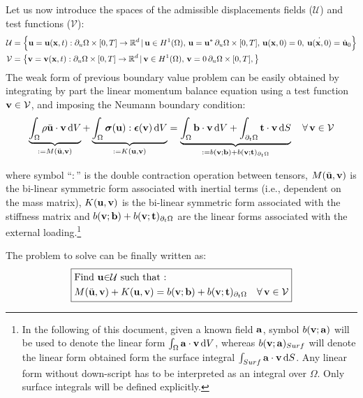 Let us now introduce the spaces of the admissible displacements fields ($\mathcal{U}$) and test functions ($\mathcal{V}$):
%
\begin{equation}
\begin{aligned}\mathcal{U} & =\left\{ {\bf{u}}={\bf{u}}({\bf{x}},t):\partial_{u}\Omega\times[0,T]\to\mathbb{R}^{d}\,|\,{\bf{u}}\in H^{1}(\Omega),\,{\bf{u}}={\bf{u}}^{*}\,\partial_{u}\Omega\times[0,T],\,{\bf{u}}({\bf{x}},0)=0,\:\dot{{\bf{u}}({\bf{x}},0)}=\dot{{\bf{u}}}_{0}\right\} \\
\mathcal{V} & =\left\{ {\bf{v}}={\bf{v}}({\bf{x}},t):\partial_{u}\Omega\times[0,T]\to\mathbb{R}^{d}\,|\,{\bf{v}}\in H^{1}(\Omega),\,{\bf{v}}=0\,\partial_{u}\Omega\times[0,T],\right\} 
\end{aligned}
\end{equation}
%
The weak form of previous boundary value problem can be easily obtained
by integrating by part the linear momentum balance equation using
a test function ${\bf{v}}\in\mathcal{V}$, and imposing the Neumann boundary
condition:
%
\begin{equation}
%
\underbrace{\int_{\Omega}\rho\ddot{\bu}\cdot\bv\,{\rm d}V}_{:=M(\ddot{\bu},\bv)}+\underbrace{\int_{\Omega}\bsigma(\bu):\bepsilon(\bv)\,{\rm d}V}_{:=K(\bu,\bv)}=\underbrace{\int_{\Omega}\bb\cdot\bv\,{\rm d}V+\int_{\partial_{t}\Omega}\bt\cdot\bv\,{\rm d}S}_{:=b(\bv;\bb)+b(\bv;\bt)_{\partial_{t}\Omega}}\quad\forall\,\bv\in\mathcal{V}
%
\end{equation}

where symbol ``$:$'' is the double contraction operation between
tensors, $M(\ddot{{\bf{u}}},{\bf{v}})$ is the bi-linear symmetric form associated
with inertial terms (i.e., dependent on the mass matrix), $K({\bf{u}},{\bf{v}})$
is the bi-linear symmetric form associated with the stiffness matrix
and $b({\bf{v}};{\bf{b}})+b({\bf{v}};{\bf t})_{\partial_{t}\Omega}$ are the linear forms
associated with the external loading.\footnote{In the following of this document, given a known field ${\bf{a}}$, symbol
$b({\bf{v}};{\bf{a}})$ will be used to denote the linear form $\int_{\Omega}{\bf{a}}\cdot{\bf{v}}\,{\rm d}V$,
whereas $b({\bf{v}};{\bf{a}})_{Surf}$ will denote the linear form obtained
form the surface integral $\int_{Surf}{\bf{a}}\cdot{\bf{v}}\,{\rm d}S$. Any
linear form without down-script has to be interpreted as an integral
over $\Omega$. Only surface integrals will be defined
explicitly.}

The problem to solve can be finally written as:
\begin{equation}
\boxed{\begin{aligned} & \text{Find \ensuremath{{\bf{u}}}\ensuremath{\in}\ensuremath{\mathcal{U}} such that : }\\
 & M(\ddot{{\bf{u}}},{\bf{v}})+K({\bf{u}},{\bf{v}})=b({\bf{v}};{\bf{b}})+b({\bf{v}};{\bf t})_{\partial_{t}\Omega}\quad\forall\,{\bf{v}}\in\mathcal{V}
\end{aligned}
}
\end{equation}

